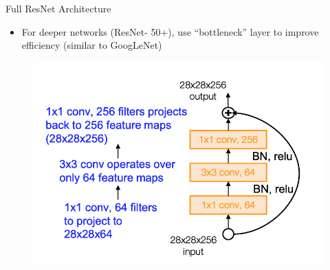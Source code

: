 \documentclass[serif, aspectratio=169]{beamer}
\begin{document}
\begin{frame}{Full ResNet Architecture}
	\begin{itemize}
		\item For deeper networks (ResNet- 50+), use “bottleneck” layer to improve efficiency (similar to GoogLeNet)
	\end{itemize}
	
	\begin{figure}[htpb]
		\begin{center}
			\includegraphics[keepaspectratio, scale=0.3]{pic/res_arch3}
		\end{center}
	\end{figure}
\end{frame}
\end{document}
